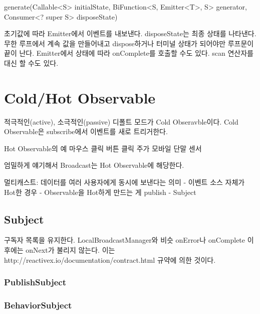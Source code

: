 \documentclass{book}
\begin{document}
generate(Callable<S> initialState, BiFunction<S, Emitter<T>, S> generator,
            Consumer<? super S> disposeState) {

초기값에 따라 Emitter에서 이벤트를 내보낸다.            
disposeState는 최종 상태를 나타낸다.
무한 루프에서 계속 값을 만들어내고 dispose하거나 터미널 상태가 되어야만 루프문이 끝이 난다.
Emitter에서 상태에 따라 onComplete를 호출할 수도 있다.
scan 연산자를 대신 할 수도 있다.


\section{Cold/Hot Observable} 
적극적인(active), 소극적인(passive)
디폴트 모드가 Cold Obseravble이다.
Cold Observable은 subscribe에서 이벤트를 새로 트리거한다.

Hot Observable의 예
마우스 클릭
버튼 클릭
주가
모바일 단말 센서

엄밀하게 얘기해서 Broadcast는 Hot Observable에 해당한다. 

멀티캐스트: 데이터를 여러 사용자에게 동시에 보낸다는 의미
- 이벤트 소스 자체가 Hot한 경우
- Observable을 Hot하게 만드는 게 publish
- Subject


\subsection{Subject}
구독자 목록을 유지한다. LocalBroadcastManager와 비슷
onError나 onComplete 이후에는 onNext가 불리지 않는다.
이는 http://reactivex.io/documentation/contract.html 규약에 의한 것이다.

\subsubsection{PublishSubject}

\subsubsection{BehaviorSubject}

}
\end{document}

